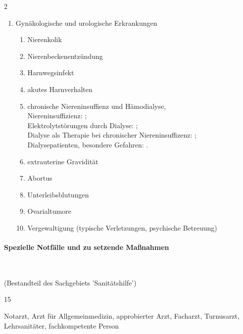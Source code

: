 \begin{WidePar}
\begin{multicols}{2}
\begin{enumerate}
\begin{enumerate}
    \end{enumerate}
    \item Gynäkologische und urologische Erkrankungen
    \begin{enumerate}
      \item Nierenkolik \dotfill {}
      \item Nierenbeckenentzündung \dotfill {}
      \item Harnwegsinfekt \dotfill {}
      \item akutes Harnverhalten \dotfill {}
      \item chronische Niereninsuffienz und Hämodialyse,
      \\
      Niereninsuffizienz: \dotfill {};
      \\
      Elektrolytstörungen durch
      Dialyse:  \dotfill {};
      \\
      Dialyse als Therapie bei chronischer
      Niereninsuffizenz:  \dotfill {};
      \\
      Dialysepatienten, besondere
      Gefahren:  \dotfill {}.
      \item extrauterine Gravidität \dotfill {}
      \item Abortus \dotfill {}
      \item  Unterleibsblutungen \dotfill  {}
      \item Ovarialtumore \dotfill  {}
      \item Vergewaltigung (typische Verletzungen, psychische Betreuung) \dotfill {}
    \end{enumerate}
  \end{enumerate}
  

\paragraph{Spezielle Notfälle und zu setzende Maßnahmen}~
  
  (Bestandteil des Sachgebiets  'Sanitätshilfe')
  
  \begin{inparadesc}
    \item[Stundenanzahl:]  15
    \item[Lehrkraft:]   Notarzt, Arzt für  Allgemeinmedizin,  approbierter
    Arzt, Facharzt,   Turnusarzt,  Lehrsanitäter,  fachkompetente Person
  \end{inparadesc}
  

\end{multicols}
\end{WidePar}
